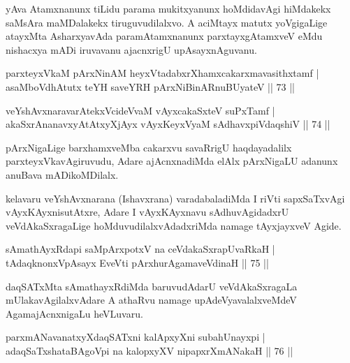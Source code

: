\begin{artha}
yAva Atamxnanunx tiLidu parama mukitxyanunx hoMdidavAgi hiMdakekx saMsAra maMDalakekx tiruguvudilalxvo. A aciMtayx matutx yoVgigaLige atayxMta AsharxyavAda paramAtamxnanunx parxtayxgAtamxveV eMdu nishacxya mADi iruvavanu ajacnxrigU upAsayxnAguvanu.
\end{artha}


\begin{shl}
parxteyxVkaM pArxNinAM heyxVtadabxrXhamxcakarxmavasithxtamf |\\
asaMboVdhAtutx teYH saveYRH pArxNiBinARnuBUyateV \hfill || 73 ||
\end{shl}
\begin{shl}
veYshAvxnaravarAtekxVcideVvaM vAyxcakaSxteV suPxTamf |\\
akaSxrAnanavxyAtAtxyXjAyx vAyxKeyxVyaM sAdhavxpiVdaqshiV \hfill || 74 ||
\end{shl}

\begin{artha}
pArxNigaLige barxhamxveMba cakarxvu savaRrigU haqdayadalilx parxteyxVkavAgiruvudu, Adare ajAcnxnadiMda elAlx pArxNigaLU adanunx anuBava mADikoMDilalx.
\end{artha}

\begin{artha}
kelavaru veYshAvxnarana (Ishavxrana) varadabaladiMda I riVti sapxSaTxvAgi vAyxKAyxnisutAtxre, Adare I vAyxKAyxnavu sAdhuvAgidadxrU veVdAkaSxragaLige hoMduvudilalxvAdadxriMda namage tAyxjayxveV Agide.
\end{artha}


\begin{shl}
sAmathAyxRdapi saMpArxpotxV na ceVdakaSxrapUvaRkaH |\\
tAdaqknonxVpAsayx EveVti pArxhurAgamaveVdinaH \hfill || 75 ||
\end{shl}

\begin{artha}
daqSATxMta sAmathayxRdiMda baruvudAdarU veVdAkaSxragaLa mUlakavAgilalxvAdare A athaRvu namage upAdeVyavalalxveMdeV AgamajAcnxnigaLu heVLuvaru.
\end{artha}

\begin{shl}
parxmANavanatxyXdaqSATxni kalApxyXni subahUnayxpi |\\
adaqSaTxshataBAgoV\s pi na kalopxyXV nipapxrXmANakaH \hfill || 76 ||
\end{shl}

